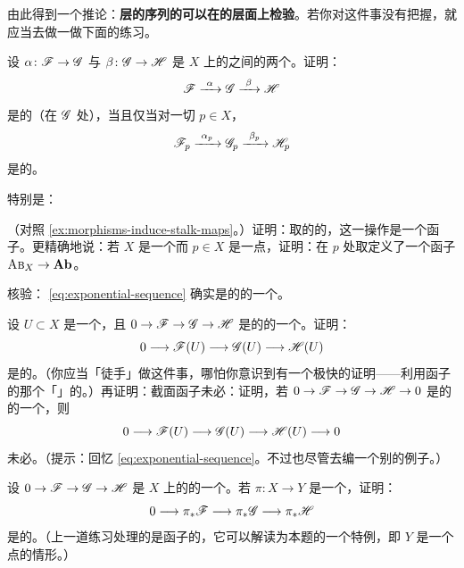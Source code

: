 由此得到一个推论：\textbf{层的序列的\trExactness{}可以在\trStalk{}的层面上检验}。若你对这件事没有把握，就应当去做一做下面的练习。

\begin{exercise}\label{ex:exactness-checked-on-stalks}
设 $\alpha\colon\mathscr{F}\to\mathscr{G}$ 与 $\beta\colon\mathscr{G}\to\mathscr{H}$ 是 $X$ 上\trAbelianGroups{}的\trSheaves{}之间的两个\trMorphism。证明：
\[
\scr{F}\mathrel{\xrightarrow{\ \alpha\ }}\scr{G}\mathrel{\xrightarrow{\ \beta\ }}\scr{H}
\]
是\trExact{}的（在 $\mathscr{G}$ 处），当且仅当对一切 $p\in X$，
\[
\scr{F}_p\mathrel{\xrightarrow{\ \alpha_p\ }}\scr{G}_p\mathrel{\xrightarrow{\ \beta_p\ }}\scr{H}_p
\]
是\trExact{}的。
\end{exercise}

特别是：

\begin{exercise}[重要练习]\label{ex:stalk-exact-functor}
（对照 \cref{ex:morphisms-induce-stalk-maps}。）证明：取\trAbelianGroups{}的\trSheaf{}的\trStalk，这一操作是一个\trExact{}函子。更精确地说：若 $X$ 是一个\trTopologicalSpace{}而 $p\in X$ 是一点，证明：在 $p$ 处取\trStalk{}定义了一个\trExact{}函子 $\textsc{Ab}_{X}\to\mathbf{Ab}$。
\end{exercise}

\begin{exercise}\label{ex:exponential-sequence-check}
核验：\trExponentialSequence{} \eqref{eq:exponential-sequence} 确实是\trAbelianGroups{}的\trSheaves{}的一个\trExactSequence。
\end{exercise}

\begin{exercise}\label{ex:sections-left-exact}
设 $U\subset X$ 是一个\trOpenSet，且 $0\to\mathscr{F}\to\mathscr{G}\to\mathscr{H}$ 是\trAbelianGroups{}的\trSheaves{}的一个\trExactSequence。证明：
\[
0\longrightarrow\mathscr{F}(U)\longrightarrow\mathscr{G}(U)\longrightarrow\mathscr{H}(U)
\]
是\trExact{}的。（你应当「徒手」做这件事，哪怕你意识到有一个极快的证明——利用\trSheafification{}函子的那个「\trForgetful」\trRightAdjoint{}的\trLeftExactness。）再证明：截面函子未必\trExact：证明，若 $0\to\mathscr{F}\to\mathscr{G}\to\mathscr{H}\to 0$ 是\trAbelianGroups{}的\trSheaves{}的一个\trExactSequence，则
\[
0\longrightarrow\mathscr{F}(U)\longrightarrow\mathscr{G}(U)\longrightarrow\mathscr{H}(U)\longrightarrow 0
\]
未必\trExact。（提示：回忆\trExponentialSequence{} \eqref{eq:exponential-sequence}。不过也尽管去编一个别的例子。）
\end{exercise}

\begin{exercise}\label{ex:pushforward-left-exact}
设 $0\to\mathscr{F}\to\mathscr{G}\to\mathscr{H}$ 是 $X$ 上\trAbelianGroups{}的\trSheaves{}的一个\trExactSequence。若 $\pi\colon X\to Y$ 是一个\trContinuousMap，证明：
\[
0\longrightarrow\pi_*\mathscr{F}\longrightarrow\pi_*\mathscr{G}\longrightarrow\pi_*\mathscr{H}
\]
是\trExact{}的。（上一道练习处理的是\trGlobalSections{}函子的\trLeftExactness，它可以解读为本题的一个特例，即 $Y$ 是一个点的情形。）
\end{exercise}

